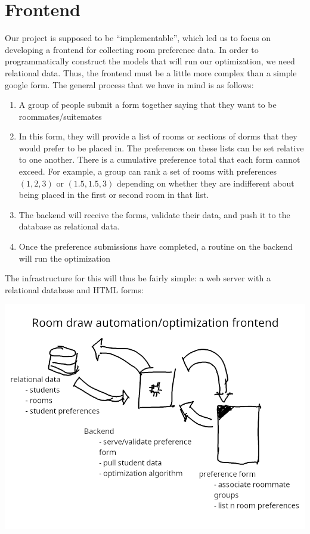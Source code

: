 \documentclass[12pt]{article}
\begin{document}
    \section*{Frontend}
    Our project is supposed to be ``implementable'', which led us to focus on developing a frontend for collecting room preference data. In order to programmatically construct the models that will run our optimization, we need relational data. Thus, the frontend must be a little more complex than a simple google form. The general process that we have in mind is as follows:
    \begin{enumerate}
        \item A group of people submit a form together saying that they want to be roommates/suitemates
        \item In this form, they will provide a list of rooms or sections of dorms that they would prefer to be placed in. The preferences on these lists can be set relative to one another. There is a cumulative preference total that each form cannot exceed. For example, a group can rank a set of rooms with preferences $(1, 2, 3)$ or $(1.5, 1.5, 3)$ depending on whether they are indifferent about being placed in the first or second room in that list.
        \item The backend will receive the forms, validate their data, and push it to the database as relational data.
        \item Once the preference submissions have completed, a routine on the backend will run the optimization
    \end{enumerate}
    The infrastructure for this will thus be fairly simple: a web server with a relational database and HTML forms:
    \begin{center}
        \includegraphics[width=0.9\linewidth]{frontend.png}
    \end{center}
    
\end{document}

